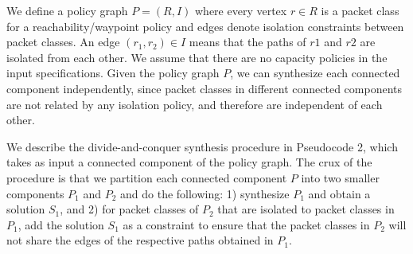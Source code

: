 We define a policy graph $P = (R, I)$ where every vertex $r \in R$
is a packet class for a reachability/waypoint policy and edges
denote isolation constraints between packet classes.
An edge $(r_1,r_2) \in I$  means that the paths of $r1$ and $r2$ are
isolated from each other. We assume that there are no capacity policies
in the input specifications. 
  Given the policy graph $P$, we
can synthesize each connected component independently, since packet
classes in different connected components are not related by any
isolation policy, and therefore are independent of each other.

We describe the divide-and-conquer synthesis procedure in Pseudocode 2,
which takes as input a connected component of the policy graph.
 The crux of the procedure is that we partition each connected component $P$
  into two smaller components $P_1$ and $P_2$
  and do the following:
1) synthesize $P_1$ and obtain a solution $S_1$, and
2) for packet classes of $P_2$ that are
isolated to packet classes in $P_1$, 
add the solution $S_1$ as a constraint to ensure that the
packet classes in $P_2$ will not share the edges of the respective
paths obtained in $P_1$. 

